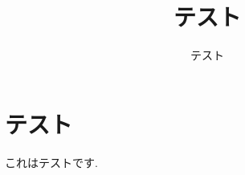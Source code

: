 \documentclass{bcsj}
\title{テスト}
\author{テスト}
\begin{document}
\maketitle

\section{テスト}
これはテストです. 
\end{document}
